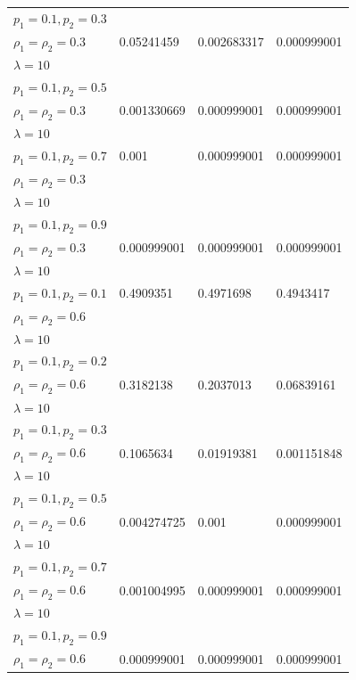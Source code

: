 \documentclass[12pt,oneside]{report}
\theoremstyle{definition}
\theoremstyle{mystyle}
\begin{document}
\begin{landscape}
\begin{center}
\begin{longtable}[h!]{|l|l|l| l|}
			$ p_{1}=0.1,p_{2}=0.3$ &  && \\
			$ \rho_{1}=\rho_{2}=0.3 $  &0.05241459  &0.002683317  &0.000999001  \\
			$\lambda=10$ &  & & \\ \hline
			$ p_{1}=0.1,p_{2}=0.5$ &  && \\
			$ \rho_{1}=\rho_{2}=0.3 $  &0.001330669  &0.000999001  & 0.000999001 \\
			$\lambda=10$ &  & & \\ \hline
			$ p_{1}=0.1,p_{2}=0.7$ &0.001 &0.000999001 &0.000999001 \\
			$ \rho_{1}=\rho_{2}=0.3 $  &   &  &\\
			$\lambda=10$ &  &  &\\ \hline
			$ p_{1}=0.1,p_{2}=0.9$ & & & \\
			$ \rho_{1}=\rho_{2}=0.3 $ & 0.000999001  & 0.000999001  &0.000999001 \\
			$\lambda=10$ &  & & \\ \hline
			$ p_{1}=0.1,p_{2}=0.1$ &0.4909351  &0.4971698 &0.4943417 \\
			$ \rho_{1}=\rho_{2}=0.6 $  &  &  & \\
			$\lambda=10$ &  &  &\\ \hline
			$ p_{1}=0.1,p_{2}=0.2$ &  &  & \\ 
			$ \rho_{1}=\rho_{2}=0.6 $  &  0.3182138 & 0.2037013 &0.06839161 \\
			$\lambda=10$ &  &  &\\ \hline
			$ p_{1}=0.1,p_{2}=0.3$&   & & \\
			$ \rho_{1}=\rho_{2}=0.6 $  &0.1065634  &0.01919381 & 0.001151848\\
			$\lambda=10$ &  &  &\\ \hline
			$ p_{1}=0.1,p_{2}=0.5$ &  && \\
			$ \rho_{1}=\rho_{2}=0.6 $  &0.004274725  &0.001  &0.000999001  \\
			$\lambda=10$ &  & & \\ \hline
			$ p_{1}=0.1,p_{2}=0.7$ & & & \\
			$ \rho_{1}=\rho_{2}=0.6 $  & 0.001004995  & 0.000999001 &0.000999001 \\
			$\lambda=10$ &  &  &\\ \hline
			$ p_{1}=0.1,p_{2}=0.9$ & & & \\
			$ \rho_{1}=\rho_{2}=0.6 $ & 0.000999001  &0.000999001   &0.000999001 \\

\end{longtable}
\end{center}
\end{landscape}
\end{document}
